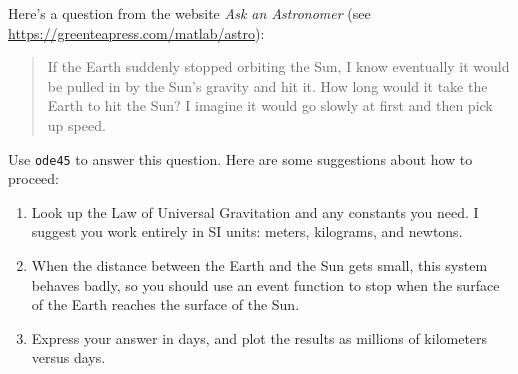 \begin{ex}
\label{earth}


Here's a question from the website \emph{Ask an Astronomer} (see \url{https://greenteapress.com/matlab/astro}):

\begin{quote}
If the Earth suddenly stopped orbiting the Sun, I know eventually it would be pulled in by the Sun's gravity and hit it. How long would it take the Earth to hit the Sun? I imagine it would go slowly at first and then pick up speed.
\end{quote}

Use \lstinline{ode45} to answer this question.  Here are some suggestions about how to proceed:

\begin{enumerate}

\item Look up the Law of Universal Gravitation and any constants you need. I suggest you work entirely in SI units: meters, kilograms, and newtons.

\item When the distance between the Earth and the Sun gets small, this system behaves badly, so you should use an event function to stop when the surface of the Earth reaches the surface of the Sun.

\item Express your answer in days, and plot the results as millions of kilometers versus days.

\end{enumerate}


\end{ex}
